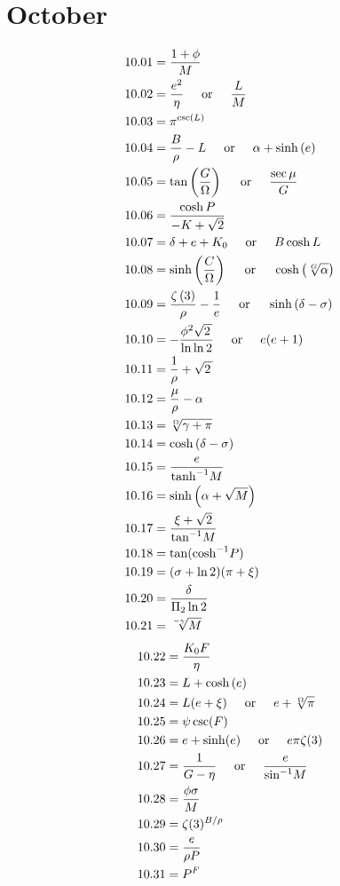 \documentclass[12pt]{article}
\newcommand{\asin}{\text{sin}^{-1}}
\newcommand{\atan}{\text{tan}^{-1}}
\newcommand{\acosh}{\text{cosh}^{-1}}
\newcommand{\atanh}{\text{tanh}^{-1}}
\newcommand{\oder}{\hspace{5mm}\text{or}\hspace{5mm}}
\begin{document}
\pagebreak
 
\section{October}
\begin{align*}
10.01 &= \frac{1+\phi}{M}\\
10.02 &= \frac{e^2}{\eta} \oder \frac{L}{M}\\
10.03 &= \pi^{\csc(L)}\\
10.04 &= \frac{B}{\rho}-L \oder \alpha+\sinh\left(e\right)\\
10.05 &= \tan\left(\frac{G}{\Omega}\right) \oder \frac{\sec \mu}{G}\\
10.06 &= \frac{\cosh P}{-K + \sqrt{2}}\\
10.07 &= \delta+e+K_{0} \oder B \cosh L\\
10.08 &= \sinh\left(\frac{C}{\Omega}\right) \oder \cosh\left(\sqrt[G]{\alpha}\right)\\
10.09 &= \frac{\zeta\left(3\right)}{\rho}-\frac{1}{e} \oder \sinh\left(\delta-\sigma\right)\\
10.10 &= -\frac{\phi^2 \sqrt{2\,}}{\ln \ln 2} \oder e(e + 1)\\
10.11 &= \frac{1}{\rho} + \sqrt{2\,}\\
10.12 &= \frac{\mu}{\rho} - \alpha\\
10.13 &= \sqrt[\Omega]{\gamma+\pi}\\
10.14 &= \cosh\left(\delta-\sigma\right)\\
10.15 &= \frac{e}{\atanh{M}}\\
10.16 &= \sinh\left(\alpha + \sqrt{M}\right)\\
10.17 &= \frac{\xi + \sqrt{2}}{\atan M}\\
10.18 &= \tan(\acosh P)\\
10.19 &= (\sigma + \ln 2)(\pi + \xi)\\
10.20 &= \frac{\delta}{\Pi_{2} \ln 2}\\
10.21 &= \sqrt[-\gamma]{M}\\
\end{align*}
\begin{align*}
10.22 &= \frac{K_{0} F}{\eta}\\
10.23 &= L + \cosh{(e)}\\
10.24 &= L (e + \xi) \oder e + \sqrt[\Omega]{\pi}\\
10.25 &= \psi \csc(F)\\
10.26 &= e + \sinh(e) \oder e \pi \zeta(3)\\
10.27 &= \frac{1}{G - \eta} \oder \frac{e}{\asin{M}}\\
10.28 &= \frac{\phi \sigma}{M}\\
10.29 &= \zeta(3)^{B/\rho}\\
10.30 &= \frac{e}{\rho P}\\
10.31 &= P^{F}\\
\end{align*}
\end{document}
